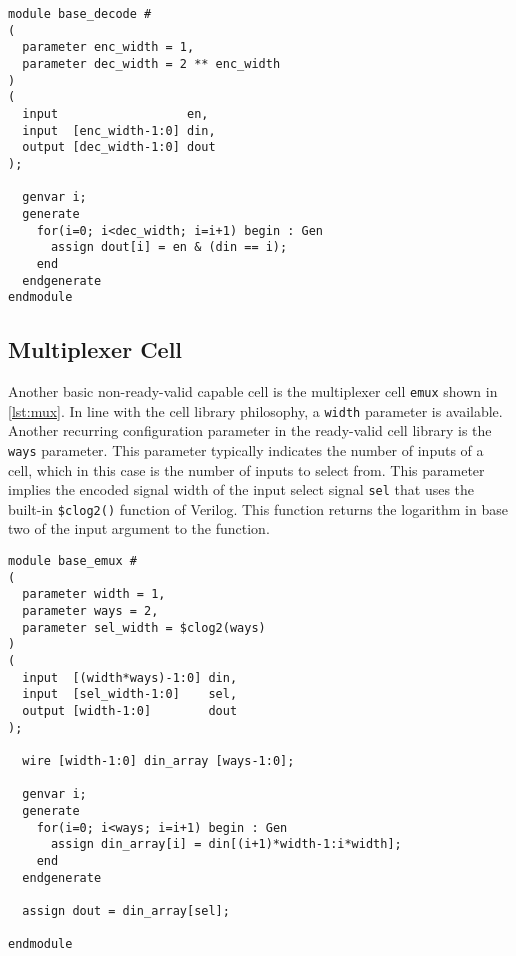 \begin{lstlisting}[style={verilog-style}, caption=Decode cell from the ready-valid cell library., label=lst:decode]
module base_decode #
(
  parameter enc_width = 1,
  parameter dec_width = 2 ** enc_width
)
(
  input                  en,
  input  [enc_width-1:0] din,
  output [dec_width-1:0] dout
);

  genvar i;
  generate
    for(i=0; i<dec_width; i=i+1) begin : Gen
      assign dout[i] = en & (din == i);
    end
  endgenerate
endmodule
\end{lstlisting}



\subsection{Multiplexer Cell}
\label{sec:mux}
Another basic non-ready-valid capable cell is the multiplexer cell \texttt{emux} shown in \autoref{lst:mux}. In line with the cell library philosophy, a \texttt{width} parameter is available. Another recurring configuration parameter in the ready-valid cell library is the \texttt{ways} parameter. This parameter typically indicates the number of inputs of a cell, which in this case is the number of inputs to select from. This parameter implies the encoded signal width of the input select signal \texttt{sel} that uses the built-in \texttt{\$clog2()} function of Verilog. This function returns the logarithm in base two of the input argument to the function.

\begin{lstlisting}[style={verilog-style}, caption=Multiplexer cell from the ready-valid cell library., label=lst:mux]
module base_emux #
(
  parameter width = 1,
  parameter ways = 2,
  parameter sel_width = $clog2(ways)
)
(
  input  [(width*ways)-1:0] din,
  input  [sel_width-1:0]    sel,
  output [width-1:0]        dout
);

  wire [width-1:0] din_array [ways-1:0];

  genvar i;
  generate
    for(i=0; i<ways; i=i+1) begin : Gen
      assign din_array[i] = din[(i+1)*width-1:i*width];
    end
  endgenerate

  assign dout = din_array[sel];

endmodule
\end{lstlisting}



